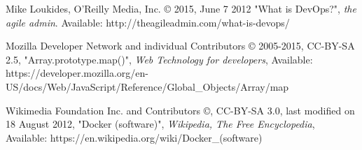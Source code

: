 \begin{thebibliography}{999}
\raggedright
Mike Loukides, O'Reilly Media, Inc. © 2015, June 7 2012
"What is DevOps?",
{\em the agile admin}.
Available: http://theagileadmin.com/what-is-devops/

\raggedright
Mozilla Developer Network and individual Contributors © 2005-2015, CC-BY-SA 2.5, "Array.prototype.map()",
{\em Web Technology for developers},
Available: https://developer.mozilla.org/en-US/docs/Web/JavaScript/Reference/Global\_Objects/Array/map

\raggedright
Wikimedia Foundation Inc. and Contributors ©, CC-BY-SA 3.0,
last modified on 18 August 2012, "Docker (software)",
{\em Wikipedia, The Free Encyclopedia},
Available: https://en.wikipedia.org/wiki/Docker\_(software)

\end{thebibliography}
